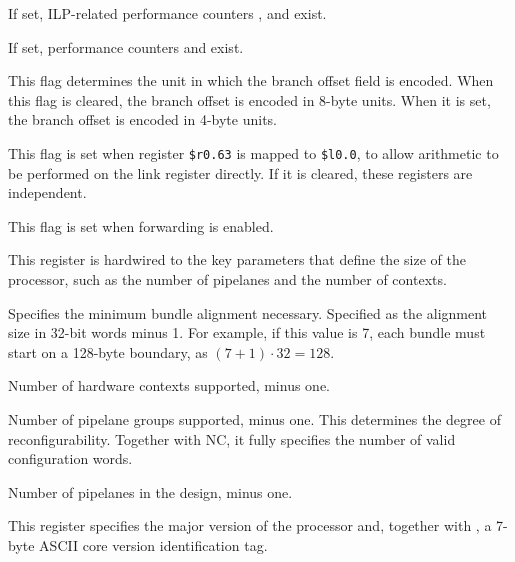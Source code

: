 \reset{*}
If set, ILP-related performance counters ,  and  exist.

\reset{*}
If set, performance counters  and  exist.

\reset{*}
This flag determines the unit in which the branch offset field is encoded. When
this flag is cleared, the branch offset is encoded in 8-byte units. When it is
set, the branch offset is encoded in 4-byte units.

\reset{*}
This flag is set when register \texttt{\$r0.63} is mapped to \texttt{\$l0.0}, to
allow arithmetic to be performed on the link register directly. If it is
cleared, these registers are independent.

\reset{*}
This flag is set when forwarding is enabled.


This register is hardwired to the key parameters that define the size of the
processor, such as the number of pipelanes and the number of contexts.

\reset{****}
Specifies the minimum bundle alignment necessary. Specified as the alignment
size in 32-bit words minus 1. For example, if this value is 7, each bundle must
start on a 128-byte boundary, as $(7 + 1) \cdot 32 = 128$.

\reset{****}
Number of hardware contexts supported, minus one.

\reset{****}
Number of pipelane groups supported, minus one. This determines the degree of
reconfigurability. Together with NC, it fully specifies the number of valid
configuration words.

\reset{****}
Number of pipelanes in the design, minus one.


This register specifies the major version of the processor and, together with
, a 7-byte ASCII core version identification tag.

